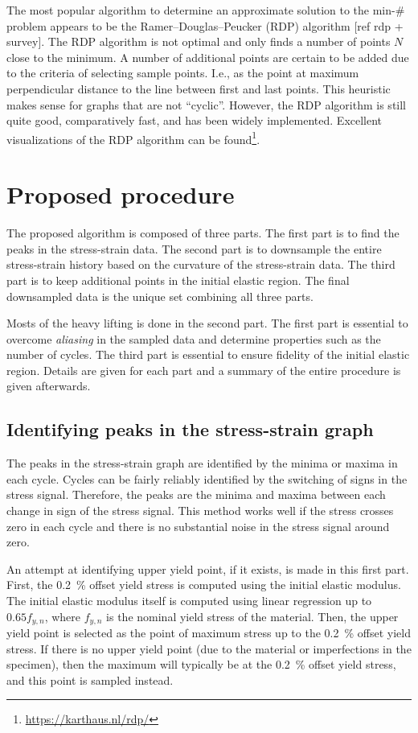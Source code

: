 \documentclass[a4paper,11pt]{article}
\begin{document}
The most popular algorithm to determine an approximate solution to the min-\# problem appears to be the Ramer–Douglas–Peucker (RDP) algorithm [ref rdp + survey].
The RDP algorithm is not optimal and only finds a number of points $N$ close to the minimum.
A number of additional points are certain to be added due to the criteria of selecting sample points.
I.e., as the point at maximum perpendicular distance to the line between first and last points.
This heuristic makes sense for graphs that are not ``cyclic''.
However, the RDP algorithm is still quite good, comparatively fast, and has been widely implemented.
Excellent visualizations of the RDP algorithm can be found\footnote{\url{https://karthaus.nl/rdp/}}.

\section{Proposed procedure}

The proposed algorithm is composed of three parts.
The first part is to find the peaks in the stress-strain data.
The second part is to downsample the entire stress-strain history based on the curvature of the stress-strain data.
The third part is to keep additional points in the initial elastic region.
The final downsampled data is the unique set combining all three parts.

Mosts of the heavy lifting is done in the second part.
The first part is essential to overcome \emph{aliasing} in the sampled data and determine properties such as the number of cycles.
The third part is essential to ensure fidelity of the initial elastic region.
Details are given for each part and a summary of the entire procedure is given afterwards.

\subsection{Identifying peaks in the stress-strain graph}

The peaks in the stress-strain graph are identified by the minima or maxima in each cycle.
Cycles can be fairly reliably identified by the switching of signs in the stress signal.
Therefore, the peaks are the minima and maxima between each change in sign of the stress signal.
This method works well if the stress crosses zero in each cycle and there is no substantial noise in the stress signal around zero.

An attempt at identifying upper yield point, if it exists, is made in this first part.
First, the 0.2~\% offset yield stress is computed using the initial elastic modulus.
The initial elastic modulus itself is computed using linear regression up to $0.65 f_{y,n}$, where $f_{y,n}$ is the nominal yield stress of the material.
Then, the upper yield point is selected as the point of maximum stress up to the 0.2~\% offset yield stress.
If there is no upper yield point (due to the material or imperfections in the specimen), then the maximum will typically be at the 0.2~\% offset yield stress, and this point is sampled instead.
\end{document}
